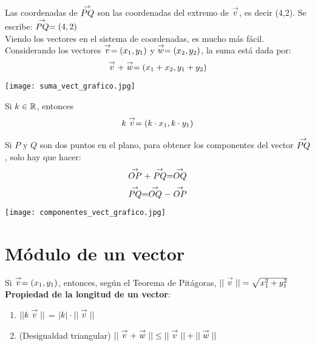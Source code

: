 Las coordenadas de $\stackrel{\to}{PQ}$ son las coordenadas del extremo de $\stackrel{\to}{v}$, es decir (4,2). Se escribe: $\stackrel{\to}{PQ} = (4,2)$\\
Viendo los vectores en el sistema de coordenadas, es mucho más fácil. \\
Considerando los vectores $\stackrel{\to}{v} = (x_1, y_1)$ y $\stackrel{\to}{w} = (x_2, y_2)$, la suma está dada por:
$$\stackrel{\to}{v} + \stackrel{\to}{w} = (x_1 + x_2, y_1 + y_2)$$

\begin{center}
    \texttt{[image: suma\_vect\_grafico.jpg]}
\end{center}

Si $k \in {\mathbb{R}}$, entonces
$$k \stackrel{\to}{v} = (k \cdot x_1, k \cdot y_1)$$

Si $P$ y $Q$ son dos puntos en el plano, para obtener los componentes del vector $\stackrel{\to}{PQ}$, solo hay que hacer:
$$\stackrel{\to}{OP} + \stackrel{\to}{PQ} = \stackrel{\to}{OQ}$$
$$\stackrel{\to}{PQ} = \stackrel{\to}{OQ} - \stackrel{\to}{OP}$$

\begin{center}
    \texttt{[image: componentes\_vect\_grafico.jpg]}
\end{center}

\section{Módulo de un vector}

\begin{center}
\end{center}

Si $\stackrel{\to}{v} = (x_1, y_1)$, entonces, según el Teorema de Pitágoras, $||\stackrel{\to}{v}|| = \sqrt{x^2_1 + y^2_1}$\\

\textbf{Propiedad de la longitud de un vector}:
\begin{enumerate}
    \item $||k \stackrel{\to}{v}||$ = $|k| \cdot ||\stackrel{\to}{v}||$
    \item (Desigualdad triangular) $||\stackrel{\to}{v} + \stackrel{\to}{w}|| \leq ||\stackrel{\to}{v}|| + ||\stackrel{\to}{w}||$
\end{enumerate}

